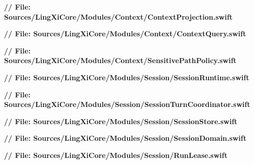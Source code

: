 \documentclass[10pt,a4paper]{article}
\newcommand{\repoRoot}{../../../}
\begin{document}
\noindent\textbf{// File: Sources/LingXiCore/Modules/Context/ContextProjection.swift}\par\vspace{2pt}

\vspace{8pt}

\noindent\textbf{// File: Sources/LingXiCore/Modules/Context/ContextQuery.swift}\par\vspace{2pt}

\vspace{8pt}

\noindent\textbf{// File: Sources/LingXiCore/Modules/Context/SensitivePathPolicy.swift}\par\vspace{2pt}

\vspace{8pt}

\noindent\textbf{// File: Sources/LingXiCore/Modules/Session/SessionRuntime.swift}\par\vspace{2pt}

\vspace{8pt}

\noindent\textbf{// File: Sources/LingXiCore/Modules/Session/SessionTurnCoordinator.swift}\par\vspace{2pt}

\vspace{8pt}

\noindent\textbf{// File: Sources/LingXiCore/Modules/Session/SessionStore.swift}\par\vspace{2pt}

\vspace{8pt}

\noindent\textbf{// File: Sources/LingXiCore/Modules/Session/SessionDomain.swift}\par\vspace{2pt}

\vspace{8pt}

\noindent\textbf{// File: Sources/LingXiCore/Modules/Session/RunLease.swift}\par\vspace{2pt}

\vspace{8pt}
\end{document}
